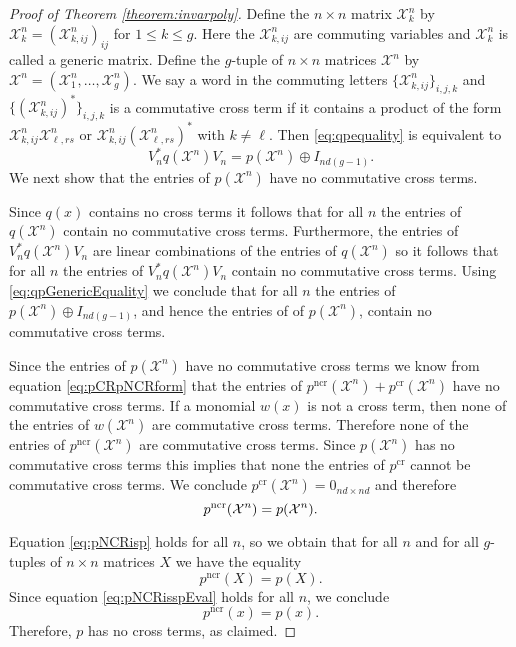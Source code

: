 \documentclass[12pt,makeidx]{amsart}
\def\beq{\begin{equation}}
\def\eeq{\end{equation}}
\numberwithin{equation}{section}
\def\cX{ {{\mathcal X}}}
\begin{document}
\begin{proof}[Proof of Theorem \ref{theorem:invarpoly}]
Define the $n \times n$ matrix $\cX^n_k$ by $\cX^n_k=(\cX^n_{k,ij})_{ij}$ for $1\leq k\leq g$. Here the $\cX^n_{k,ij}$ are commuting variables and $\cX^n_k$ is called a generic matrix. Define the $g$-tuple of $n \times n$ matrices $\cX^n$ by $\cX^n=(\cX_1^n, \dots, \cX_g^n)$. We say a word in the commuting letters $\{\cX^n_{k,ij}\}_{i,j,k}$ and $\{(\cX^n_{k,ij})^*\}_{i,j,k}$ is a commutative cross term if it contains a product of the form  $\cX^n_{k,ij} \cX^n_{\ell,rs}$ or $\cX_{k,ij}^n (\cX_{\ell,rs}^n)^*$ with $k \neq \ell$. Then \eqref{eq:qpequality} is equivalent to
\beq
 \label{eq:qpGenericEquality}
V_n^* q(\cX^n) V_n=p(\cX^n)\oplus I_{nd(g-1)}.
\eeq
We next show that the entries of $p(\cX^n)$ have no commutative cross terms.



Since $q(x)$ contains no cross terms it follows that for all $n$ the entries of $q(\cX^n)$ contain no commutative cross terms. Furthermore, the entries of $V_n^* q(\cX^n) V_n$ are linear combinations of the entries of $q (\cX^n)$ so it follows that for all $n$ the entries of $V_n^* q(\cX^n) V_n$ contain no commutative cross terms. Using  \eqref{eq:qpGenericEquality} we conclude that for all $n$ the entries of $p(\cX^n)\oplus I_{nd(g-1)}$, and hence the entries of of $p(\cX^n)$, contain no commutative cross terms.




Since the entries of $p(\cX^n)$ have no commutative cross terms we know from equation \eqref{eq:pCRpNCRform} that the entries of
$
p^{\mathrm{ncr}} (\cX^n)+p^{\mathrm{cr}} (\cX^n)
$
have no commutative cross terms. If a monomial $w(x)$ is not a cross term, then none of the entries of $w(\cX^n)$ are commutative cross terms. Therefore none of the entries of $p^{\mathrm{ncr}} (\cX^n)$ are commutative cross terms. Since $p(\cX^n)$ has no commutative cross terms this implies that none the entries of $p^{\mathrm{cr}}$ cannot be commutative cross terms. We conclude
$p^{\mathrm{cr}} (\cX^n)=0_{nd \times nd}$
and therefore
\beq
\label{eq:pNCRisp}
p^{\rm ncr} (\cX^n)=p(\cX^n).
\eeq

Equation \eqref{eq:pNCRisp} holds for all $n$, so we obtain that for all $n$ and for all $g$-tuples of $n \times n$ matrices $X$ we have the equality
\beq
\label{eq:pNCRisspEval}
p^\mathrm{ncr} (X)=p(X).
\eeq
Since equation \eqref{eq:pNCRisspEval} holds for all $n$, we conclude 
\beq
\label{eq:rhoEqualsp}
p^\mathrm{ncr} (x)=p(x).
\eeq
Therefore, $p$ has no cross terms, as claimed. 






\end{proof}
\end{document}
